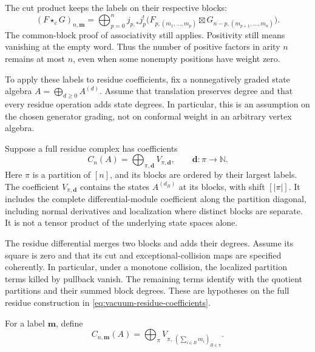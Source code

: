 The cut product keeps the labels on their respective blocks:
\[
 (F\star_cG)_{n,\mathbf m}
 =\bigoplus_{p=0}^n j_{p,*}j_p^!
 \bigl(F_{p,(m_1,\ldots,m_p)}\boxtimes
       G_{n-p,(m_{p+1},\ldots,m_n)}\bigr).
\]
The common-block proof of associativity still applies.  Positivity
still means vanishing at the empty word.  Thus the number of
positive factors in arity \(n\) remains at most \(n\), even when
some nonempty positions have weight zero.

To apply these labels to residue coefficients, fix a nonnegatively
graded state algebra \(A=\bigoplus_{d\geq0}A^{(d)}\).  Assume that
translation preserves degree and that every residue operation adds
state degrees.  In particular, this is an assumption on the chosen
generator grading, not on conformal weight in an arbitrary vertex
algebra.

Suppose a full residue complex has coefficients
\begin{equation}
 C_n(A)=\bigoplus_{\pi,\mathbf d}V_{\pi,\mathbf d},
 \qquad \mathbf d:\pi\longrightarrow\mathbb N.
 \label{eq:vacuum-residue-coefficients}
\end{equation}
Here \(\pi\) is a partition of \([n]\), and its blocks are ordered
by their largest labels.  The coefficient \(V_{\pi,\mathbf d}\)
contains the states \(A^{(d_B)}\) at its blocks, with shift
\([|\pi|]\).  It includes the complete differential-module
coefficient along the partition diagonal, including normal
derivatives and localization where distinct blocks are separate.
It is not a tensor product of the underlying state spaces alone.

The residue differential merges two blocks and adds their degrees.
Assume its square is zero and that its cut and exceptional-collision
maps are specified coherently.  In particular, under a monotone
collision, the localized partition terms killed by pullback vanish.
The remaining terms identify with the quotient partitions and their
summed block degrees.  These are hypotheses on the full residue
construction in \eqref{eq:vacuum-residue-coefficients}.

For a label \(\mathbf m\), define
\begin{equation}
 C_{n,\mathbf m}(A)
 =\bigoplus_\pi V_{\pi,\,(\sum_{i\in B}m_i)_{B\in\pi}}.
 \label{eq:vacuum-multiplicity-coefficient}
\end{equation}

